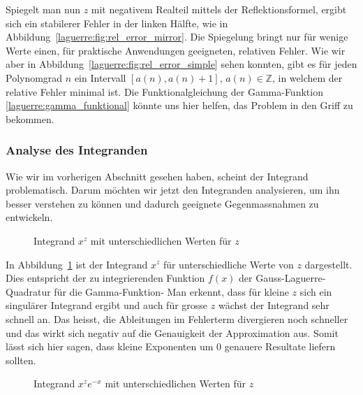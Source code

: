 Spiegelt man nun $z$ mit negativem Realteil mittels der Reflektionsformel,
ergibt sich ein stabilerer Fehler in der linken Hälfte,
wie in Abbildung~\ref{laguerre:fig:rel_error_mirror}.
Die Spiegelung bringt nur für wenige Werte einen,
für praktische Anwendungen geeigneten,
relativen Fehler.
Wie wir aber in Abbildung~\ref{laguerre:fig:rel_error_simple} sehen konnten,
gibt es für jeden Polynomgrad $n$ ein Intervall $[a(n), a(n) + 1]$,
$a(n) \in \mathbb{Z}$,
in welchem der relative Fehler minimal ist.
Die Funktionalgleichung der Gamma-Funktion \eqref{laguerre:gamma_funktional}
könnte uns hier helfen,
das Problem in den Griff zu bekommen.

\subsubsection{Analyse des Integranden}
Wie wir im vorherigen Abschnitt gesehen haben,
scheint der Integrand problematisch.
Darum möchten wir jetzt den Integranden analysieren,
um ihn besser verstehen zu können und
dadurch geeignete Gegenmassnahmen zu entwickeln.

\begin{figure}
\centering

\vspace{-12pt}
\caption{Integrand $x^z$ mit unterschiedlichen Werten für $z$}
\label{laguerre:fig:integrand}
\end{figure}

In Abbildung~\ref{laguerre:fig:integrand} ist der Integrand $x^z$ für
unterschiedliche Werte von $z$ dargestellt.
Dies entspricht der zu integrierenden Funktion $f(x)$
der Gauss-Laguerre-Quadratur für die Gamma-Funktion-
Man erkennt,
dass für kleine $z$ sich ein singulärer Integrand ergibt
und auch für grosse $z$ wächst der Integrand sehr schnell an.
Das heisst,
die Ableitungen im Fehlerterm divergieren noch schneller
und das wirkt sich negativ auf die Genauigkeit der Approximation aus.
Somit lässt sich hier sagen,
dass kleine Exponenten um $0$ genauere Resultate liefern sollten.

\begin{figure}
\centering

\vspace{-12pt}
\caption{Integrand $x^z e^{-x}$ mit unterschiedlichen Werten für $z$}
\label{laguerre:fig:integrand_exp}
\end{figure}

